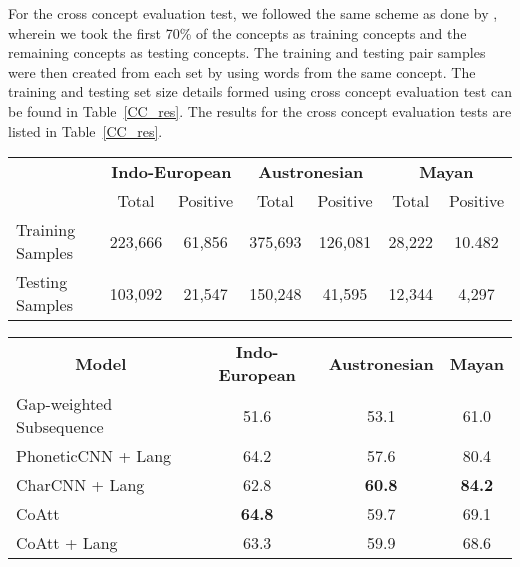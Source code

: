 \documentclass[11pt,letterpaper]{article}
\begin{document}
For the cross concept evaluation test, we followed the same scheme as done by \citet{rama2016siamese}, wherein we took the first 70\% of the concepts as training concepts and the remaining concepts as testing concepts. The training and testing pair samples were then created from each set by using words from the same concept. The training and testing set size details formed using cross concept evaluation test can be found in Table~\ref{CC_res}. The results for the cross concept evaluation tests are listed in Table~\ref{CC_res}.

\begin{table*}[t]
\centering
\begin{tabular}{lcccccc}
\multicolumn{1}{c}{\textbf{}} & \multicolumn{2}{c}{\textbf{Indo-European}} & \multicolumn{2}{c}{\textbf{Austronesian}} & \multicolumn{2}{c}{\textbf{Mayan}} \\
\multicolumn{1}{c}{}          & Total               & Positive             & Total               & Positive            & Total           & Positive         \\
Training Samples              & 223,666             & 61,856               & 375,693             & 126,081             & 28,222          & 10.482           \\
Testing Samples               & 103,092             & 21,547               & 150,248             & 41,595              & 12,344          & 4,297           
\end{tabular}
\caption{Data size for Cross Concept Evaluation}
\label{CC_count}
\end{table*}

\begin{table*}[t]
\centering
\begin{tabular}{lccc}
\multicolumn{1}{c}{\textbf{Model}} & \textbf{Indo-European} & \textbf{Austronesian} & \textbf{Mayan} \\
Gap-weighted Subsequence           & 51.6                   & 53.1                  & 61.0           \\
PhoneticCNN + Lang                 & 64.2                   & 57.6                  & 80.4           \\
CharCNN + Lang                     & 62.8                   & \textbf{60.8}                  & \textbf{84.2}           \\
CoAtt                              & \textbf{64.8}                   & 59.7                  & 69.1           \\
CoAtt + Lang                       & 63.3                   & 59.9                  & 68.6          
\end{tabular}
\label{CC_res}
\caption{Cross Concept Evaluation Results}
\end{table*}
\end{document}
